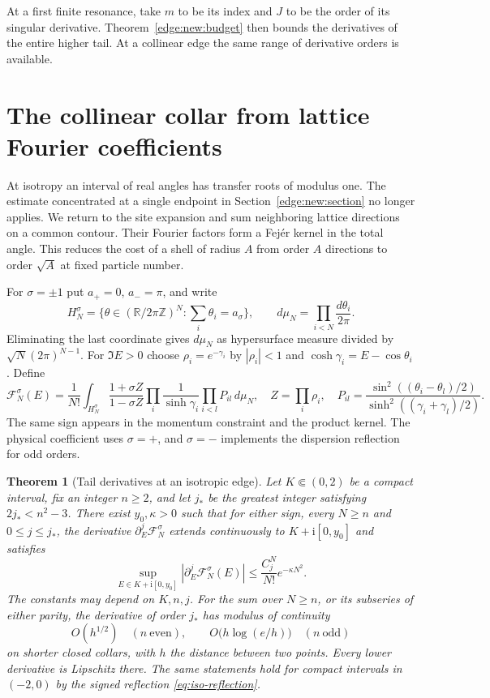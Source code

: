 \documentclass[11pt]{article}
\numberwithin{equation}{section}
\newtheorem{theorem}{Theorem}[section]
\theoremstyle{definition}
\newcommand{\R}{\mathbb R}
\newcommand{\ii}{\mathrm i}
\begin{document}
At a first finite resonance, take $m$ to be its index and $J$ to be
the order of its singular derivative. Theorem~\ref{edge:new:budget}
then bounds the derivatives of the entire higher tail. At a
collinear edge the same range of derivative orders is available.

\section{The collinear collar from lattice Fourier coefficients}
\label{iso:new:section}

At isotropy an interval of real angles has transfer roots of modulus
one. The estimate concentrated at a single endpoint in
Section~\ref{edge:new:section} no longer applies. We return to the
site expansion and sum neighboring lattice directions on a common
contour. Their Fourier factors form a Fej\'er kernel in the total
angle. This reduces the cost of a shell of radius $A$ from order $A$
directions to order $\sqrt A$ at fixed particle number.

For $\sigma=\pm1$ put $a_+=0$, $a_-=\pi$, and write
\[
 H_N^\sigma=\{\theta\in(\R/2\pi\mathbb Z)^N:
                    \textstyle\sum_i\theta_i=a_\sigma\},\qquad
 d\mu_N=\prod_{i<N}\frac{d\theta_i}{2\pi}.
\]
Eliminating the last coordinate gives $d\mu_N$ as hypersurface measure
divided by $\sqrt N(2\pi)^{N-1}$. For $\Im E>0$
choose $\rho_i=e^{-\gamma_i}$ by $|\rho_i|<1$ and
$\cosh\gamma_i=E-\cos\theta_i$.  Define
\begin{equation}\label{iso:new:F}
 \mathcal F_N^\sigma(E)=\frac1{N!}\int_{H_N^\sigma}
 \frac{1+\sigma Z}{1-\sigma Z}
 \prod_i\frac1{\sinh\gamma_i}\prod_{i<l}P_{il}\,d\mu_N,
 \quad Z=\prod_i\rho_i,
 \quad P_{il}=\frac{\sin^2((\theta_i-\theta_l)/2)}
                       {\sinh^2((\gamma_i+\gamma_l)/2)}.
\end{equation}
The same sign appears in the momentum constraint and the product
kernel. The physical coefficient uses $\sigma=+$, and $\sigma=-$
implements the dispersion reflection for odd orders.

\begin{theorem}[Tail derivatives at an isotropic edge]\label{iso:new:budget}
Let $K\Subset(0,2)$ be a compact interval, fix an integer $n\ge2$,
and let $j_*$ be the greatest integer satisfying $2j_*<n^2-3$.
There exist $y_0,\kappa>0$ such that for either sign, every $N\ge n$
and $0\le j\le j_*$, the derivative $\partial_E^j\mathcal F_N^\sigma$
extends continuously to $K+\ii[0,y_0]$ and satisfies
\begin{equation}\label{iso:new:majorant}
 \sup_{E\in K+\ii[0,y_0]}|\partial_E^j\mathcal F_N^\sigma(E)|
       \le \frac{C_j^N}{N!}e^{-\kappa N^2}.
\end{equation}
The constants may depend on $K,n,j$. For the sum over $N\ge n$,
or its subseries of either parity, the derivative of order $j_*$
has modulus of continuity
\[
  O(h^{1/2})\quad(n\ \text{even}),\qquad
  O\bigl(h\log(e/h)\bigr)\quad(n\ \text{odd})
\]
on shorter closed collars, with $h$ the distance between two points.
Every lower derivative is Lipschitz there. The same statements hold
for compact intervals in $(-2,0)$ by the signed reflection
\eqref{eq:iso-reflection}.
\end{theorem}
\end{document}
